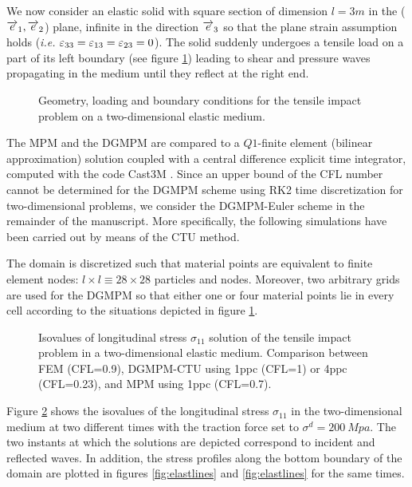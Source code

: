 We now consider an elastic solid with square section of dimension $l=3m$ in the (${\overrightarrow{e}}_1,{\overrightarrow{e}}_2$) plane, infinite in the direction ${\overrightarrow{e}}_3$ so that the plane strain assumption holds (\textit{i.e. $\varepsilon_{33}=\varepsilon_{13}=\varepsilon_{23}=0$}). The solid suddenly undergoes a tensile load on a part of its left boundary (see figure \ref{fig:2D_planeStrain}) leading to shear and pressure waves propagating in the medium until they reflect at the right end.
\begin{figure}[h!]
  \centering
   \qquad
  \caption{Geometry, loading and boundary conditions for the tensile impact problem on a two-dimensional elastic medium.}
  \label{fig:2D_planeStrain}
\end{figure}
The MPM and the DGMPM are compared to a $Q1$-finite element (bilinear approximation) solution coupled with a central difference explicit time integrator, computed with the code Cast3M \cite{Castem}.
Since an upper bound of the CFL number cannot be determined for the DGMPM scheme using RK2 time discretization for two-dimensional problems, we consider the DGMPM-Euler scheme in the remainder of the manuscript.
More specifically, the following simulations have been carried out by means of the CTU method.

The domain is discretized such that material points are equivalent to finite element nodes: $l\times l \equiv 28 \times 28$ particles and nodes.
Moreover, two arbitrary grids are used for the DGMPM so that either one or four material points lie in every cell according to the situations depicted in figure \ref{fig:2D_planeStrain}.
\begin{figure}[h!]
  \centering
  
  \caption{Isovalues of longitudinal stress $\sigma_{11}$ solution of the tensile impact problem in a two-dimensional elastic medium. Comparison between FEM (CFL=0.9), DGMPM-CTU using 1ppc (CFL=1) or 4ppc (CFL=0.23), and MPM using 1ppc (CFL=0.7).}
  \label{fig:2delast_comparison}
\end{figure}
Figure \ref{fig:2delast_comparison} shows the isovalues of the longitudinal stress $\sigma_{11}$ in the two-dimensional medium at two different times with the traction force set to $\sigma^d=200\: Mpa$.
The two instants at which the solutions are depicted correspond to incident and reflected waves. In addition, the stress profiles along the bottom boundary of the domain are plotted in figures \ref{fig:elastlines} and \ref{fig:elastlines} for the same times.

